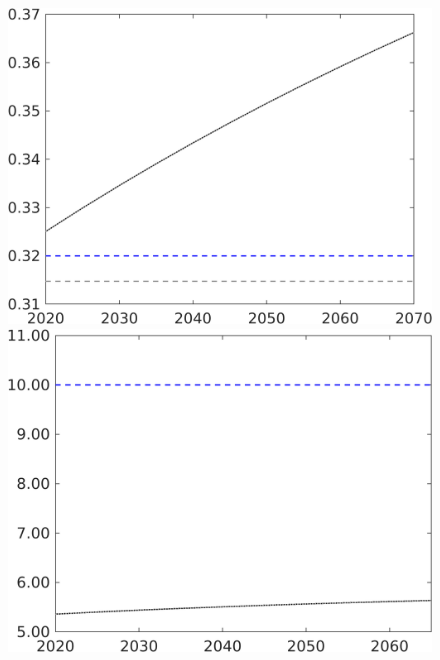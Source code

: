\begin{figure}[h!!]
\begin{minipage}[]{0.32\textwidth}
	\end{minipage}
	\begin{minipage}[]{0.32\textwidth}
		\includegraphics[width=1\textwidth]{../../codding_model/own_basedOnFried/optimalPol_190722_tidiedUp/figures/all_10Aout22/CountXgrTaulLF_target_pf_spillover0_sep1_extern0_PV1_etaa0.79_lgd0.png}
	\end{minipage}
	\begin{minipage}[]{0.32\textwidth}
		\includegraphics[width=1\textwidth]{../../codding_model/own_basedOnFried/optimalPol_190722_tidiedUp/figures/all_10Aout22/CountXgrTaulLF_target_gAagg_spillover0_sep1_extern0_PV1_etaa0.79_lgd0.png}
	\end{minipage}
\end{figure}


